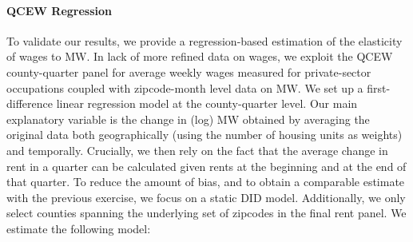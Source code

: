 %
%
%
%
%
%
%

\paragraph{QCEW Regression} To validate our results, we provide a 
regression-based estimation of the elasticity of wages to MW. In lack of more refined data on wages, 
we exploit the QCEW county-quarter panel for average weekly wages measured for private-sector occupations
coupled with zipcode-month level data on MW. We set up a first-difference linear regression model at the 
county-quarter level. Our main explanatory variable is the change in (log) MW obtained by averaging the 
original data both geographically (using the number of housing units as weights) and temporally. 
Crucially, we then rely on the fact that the average change in rent in a quarter can be calculated 
given rents at the beginning and at the end of that quarter. To reduce the amount of bias, and to obtain 
a comparable estimate with the previous exercise, we focus on a static DID model. Additionally, we only 
select counties spanning the underlying set of zipcodes in the final rent panel. We estimate the following model: 

